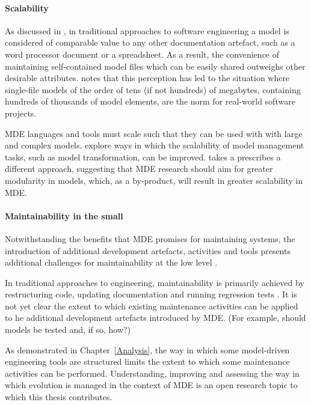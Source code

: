 \paragraph{Scalability} As discussed in \cite{rose10concordance}, in traditional approaches to software engineering a model is considered of comparable value to any other documentation artefact, such as a word processor document or a spreadsheet. As a result, the convenience of maintaining self-contained model files which can be easily shared outweighs other desirable attributes. \cite{kolovos08scalability} notes that this perception has led to the situation where single-file models of the order of tens (if not hundreds) of megabytes, containing hundreds of thousands of model elements, are the norm for real-world software projects.

MDE languages and tools must scale such that they can be used with with large and complex models. \cite{hearnden06incremental,rath08live,tratt08change} explore ways in which the scalability of model management tasks, such as model transformation, can be improved. \cite{kolovos08scalability} takes a prescribes a different approach, suggesting that MDE research should aim for greater modularity in models, which, as a by-product, will result in greater scalability in MDE.

\paragraph{Maintainability in the small} Notwithstanding the benefits that MDE promises for maintaining systems, the introduction of additional development artefacts, activities and tools presents additional challenges for maintainability at the low level \cite{Mens07}.

In traditional approaches to engineering, maintainability is primarily achieved by restructuring code, updating documentation and running regression tests \cite{feathers04working}. It is not yet clear the extent to which existing maintenance activities can be applied to he additional development artefacts introduced by MDE. (For example, should models be tested and, if so, how?)

As demonstrated in Chapter~\ref{Analysis}, the way in which some model-driven engineering tools are structured limits the extent to which some maintenance activities can be performed. Understanding, improving and assessing the way in which evolution is managed in the context of MDE is an open research topic to which this thesis contributes. 

